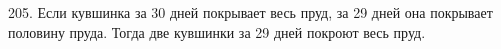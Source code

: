 205. Если кувшинка за 30 дней покрывает весь пруд, за 29 дней она покрывает половину пруда. Тогда две кувшинки за 29 дней покроют весь пруд.\\
